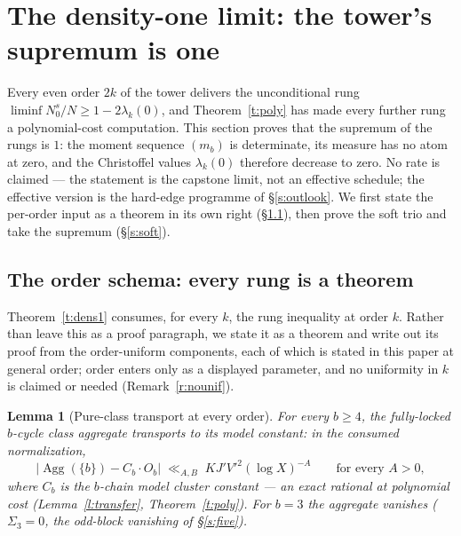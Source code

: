 \documentclass[11pt]{article}
\numberwithin{equation}{section}
\newtheorem{lemma}[theorem]{Lemma}
\theoremstyle{definition}
\theoremstyle{remark}
\begin{document}
\section{The density-one limit: the tower's supremum is
one}\label{s:dens}

Every even order $2k$ of the tower delivers the unconditional
rung $\liminf N_0^{s}/N\ge1-2\lambda_k(0)$, and
Theorem~\ref{t:poly} has made every further rung a
polynomial-cost computation. This section proves that the
supremum of the rungs is $1$: the moment sequence
$(m_b)$ is determinate, its measure has no atom at zero, and
the Christoffel values $\lambda_k(0)$ therefore decrease to
zero. No rate is claimed --- the statement is the capstone
limit, not an effective schedule; the effective version is
the hard-edge programme of \S\ref{s:outlook}. We first state
the per-order input as a theorem in its own right
(\S\ref{s:schema}), then prove the soft trio and take the
supremum (\S\ref{s:soft}).

\subsection{The order schema: every rung is a
theorem}\label{s:schema}

Theorem~\ref{t:dens1} consumes, for every $k$, the rung
inequality at order $k$. Rather than leave this as a proof
paragraph, we state it as a theorem and write out its proof
from the order-uniform components, each of which is stated in
this paper at general order; order enters only as a
displayed parameter, and no uniformity in $k$ is claimed or
needed (Remark~\ref{r:nounif}).

\begin{lemma}[Pure-class transport at every
order]\label{l:pure}
For every $b\ge4$, the fully-locked $b$-cycle class
aggregate transports to its model constant: in the consumed
normalization,
\[
\bigl|\operatorname{Agg}(\{b\})-C_b\cdot O_b\bigr|
\;\ll_{A,B}\;KJ'V'^{2}(\log X)^{-A}
\qquad\text{for every }A>0,
\]
where $C_b$ is the $b$-chain model cluster constant --- an
exact rational at polynomial cost
(Lemma~\ref{l:transfer}, Theorem~\ref{t:poly}). For $b=3$
the aggregate vanishes ($\Sigma_3=0$, the odd-block
vanishing of \S\ref{s:five}).
\end{lemma}
\end{document}
